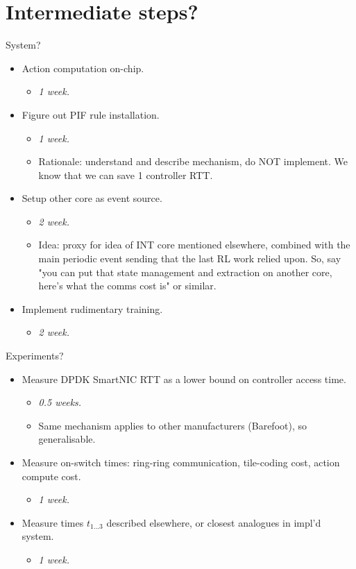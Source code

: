 \documentclass[sigconf,natbib=false]{acmart}
\begin{document}
\section{Intermediate steps?}
System?
\begin{itemize}
	\item Action computation on-chip.
	\begin{itemize}
		\item \emph{\num{1} week.}
	\end{itemize}
	\item Figure out PIF rule installation.
	\begin{itemize}
		\item \emph{\num{1} week.}
		\item Rationale: understand and describe mechanism, do NOT implement. We know that we can save 1 controller RTT.
	\end{itemize}
	\item Setup other core as event source.
	\begin{itemize}
		\item \emph{\num{2} week.}
		\item Idea: proxy for idea of INT core mentioned elsewhere, combined with the main periodic event sending that the last RL work relied upon. So, say "you can put that state management and extraction on another core, here's what the comms cost is" or similar.
	\end{itemize}
	\item Implement rudimentary training.
	\begin{itemize}
		\item \emph{\num{2} week.}
	\end{itemize}
\end{itemize}

Experiments?
\begin{itemize}
	\item Measure DPDK SmartNIC RTT as a lower bound on controller access time.
	\begin{itemize}
		\item \emph{\num{0.5} weeks.}
		\item Same mechanism applies to other manufacturers (Barefoot), so generalisable.
	\end{itemize}
	\item Measure on-switch times: ring-ring communication, tile-coding cost, action compute cost.
	\begin{itemize}
		\item \emph{\num{1} week.}
	\end{itemize}
	\item Measure times $t_{1...3}$ described elsewhere, or closest analogues in impl'd system.
	\begin{itemize}
		\item \emph{\num{1} week.}
	\end{itemize}
\end{itemize}
\end{document}
